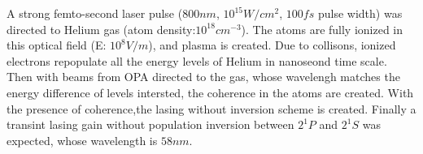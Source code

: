 A strong femto-second laser pulse ($800nm$, $10^{15} W/cm^2$, $100fs$ pulse width) was directed to Helium gas (atom density:$10^{18}cm^{-3}$). The atoms are fully ionized in this optical field (E: $10^8 V/m$), and plasma is created. Due to collisons, ionized electrons repopulate all the energy levels of Helium in nanoseond time scale. Then with beams from OPA directed to the gas, whose wavelengh matches the energy difference of levels intersted, the coherence in the atoms are created. With the presence of coherence,the lasing without inversion scheme is created. Finally a transint lasing gain without population inversion between $2^1P$ and $2^1S$ was expected, whose wavelength is $58nm$.
